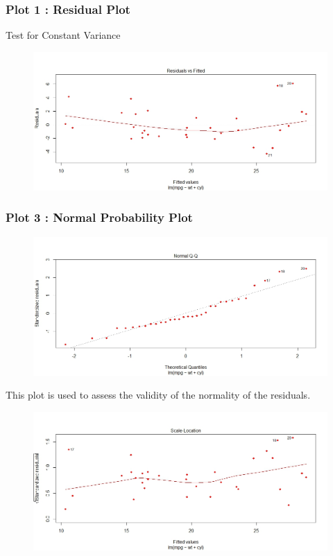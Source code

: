 \documentclass[residuals.tex]{subfiles}
\begin{document}
\subsubsection*{Plot 1 : Residual Plot}


Test for Constant Variance
\begin{figure}[h!]
	\centering
	\includegraphics[width=0.95\linewidth]{./mtcarsDiagPlot1}
	
	\label{mtcarsDiagPlot1}
\end{figure}

\newpage
\subsubsection*{Plot 3 : Normal Probability Plot}
\begin{figure}[h!]
	\centering
	\includegraphics[width=0.95\linewidth]{./mtcarsDiagPlot2}
	
	\label{mtcarsDiagPlot2}
\end{figure}


This plot is used to assess the validity of the normality of the residuals.
\begin{figure}[h!]
	\centering
	\includegraphics[width=0.95\linewidth]{./mtcarsDiagPlot3}
	
	\label{mtcarsDiagPlot3}
\end{figure}
\end{document}
